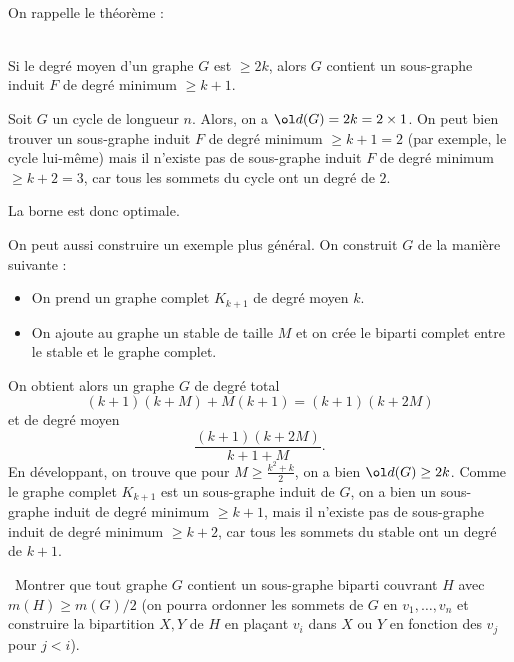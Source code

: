 \begin{td-sol}\,\\
    On rappelle le th\'eor\`eme :
    \begin{theorem}\,\\
        Si le degr\'e moyen d'un graphe \(G\) est \(\geq 2k\), alors \(G\) contient un sous-graphe induit \(F\) de degr\'e minimum \(\geq k + 1\).
    \end{theorem}

    Soit \(G\) un cycle de longueur \(n\).
    Alors, on a \(\ol d(G) = 2k = 2 \times 1\).
    On peut bien trouver un sous-graphe induit \(F\) de degr\'e minimum \(\geq k + 1 = 2\) (par exemple, le cycle lui-m\^eme) mais il n'existe pas de sous-graphe induit \(F\) de degr\'e minimum \(\geq k + 2 = 3\), car tous les sommets du cycle ont un degr\'e de \(2\).

    La borne est donc optimale.

    On peut aussi construire un exemple plus g\'en\'eral.
    On construit \(G\) de la mani\`ere suivante :
    \begin{itemize}
        \item On prend un graphe complet \(K_{k + 1}\) de degr\'e moyen \(k\).
        \item On ajoute au graphe un stable de taille \(M\) et on cr\'ee le biparti complet entre le stable et le graphe complet.
    \end{itemize}
    On obtient alors un graphe \(G\) de degr\'e total
    \begin{equation*}
        \left(k+1\right)\left(k+M\right) + M\left(k+1\right) = \left(k+1\right)\left(k+2M\right)
    \end{equation*}
    et de degr\'e moyen
    \begin{equation*}
        \frac{\left(k+1\right)\left(k+2M\right)}{k+1+M}.
    \end{equation*}
    En d\'eveloppant, on trouve que pour \(M \geq \frac{k^2 + k}{2}\), on a bien \(\ol d(G) \geq 2k\).
    Comme le graphe complet \(K_{k + 1}\) est un sous-graphe induit de \(G\), on a bien un sous-graphe induit de degr\'e minimum \(\geq k + 1\), mais il n'existe pas de sous-graphe induit de degr\'e minimum \(\geq k + 2\), car tous les sommets du stable ont un degr\'e de \(k + 1\).
\end{td-sol}

\begin{td-exo}\, %
    Montrer que tout graphe \(G\) contient un sous-graphe biparti couvrant \(H\) avec \(m(H) \geq m(G)/2\) (on pourra ordonner les sommets de \(G\) en \(v_1,\ldots,v_n\) et construire la bipartition \(X, Y\) de \(H\) en pla\c cant \(v_i\) dans \(X\) ou \(Y\) en fonction des \(v_j\) pour \(j < i\)).
\end{td-exo}

